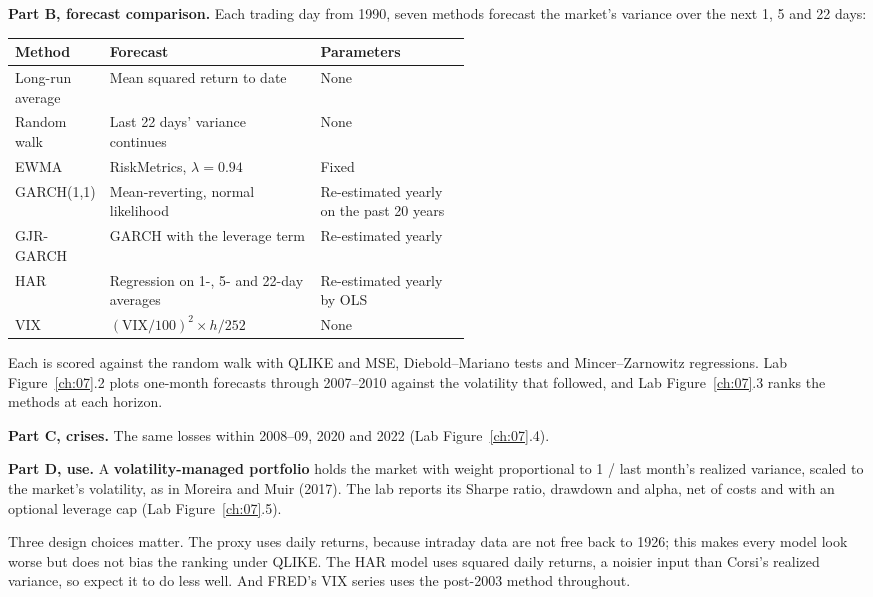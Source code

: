 \textbf{Part B, forecast comparison.} Each trading day from 1990, seven methods forecast the market's variance over the next 1, 5 and 22 days:

\begin{center}
\small
\begin{tabularx}{0.9\linewidth}{@{}>{\raggedright\arraybackslash}p{0.20\linewidth}>{\raggedright\arraybackslash}X>{\raggedright\arraybackslash}p{0.33\linewidth}@{}}
\toprule
Method & Forecast & Parameters \\
\midrule
Long-run average & Mean squared return to date & None \\
Random walk & Last 22 days' variance continues & None \\
EWMA & RiskMetrics, $\lambda = 0.94$ & Fixed \\
GARCH(1,1) & Mean-reverting, normal likelihood & Re-estimated yearly on the past 20 years \\
GJR-GARCH & GARCH with the leverage term & Re-estimated yearly \\
HAR & Regression on 1-, 5- and 22-day averages & Re-estimated yearly by OLS \\
VIX & $(\mathrm{VIX}/100)^2 \times h/252$ & None \\
\bottomrule
\end{tabularx}
\end{center}

Each is scored against the random walk with QLIKE and MSE, Diebold--Mariano tests and Mincer--Zarnowitz regressions. Lab Figure~\ref{ch:07}.2 plots one-month forecasts through 2007--2010 against the volatility that followed, and Lab Figure~\ref{ch:07}.3 ranks the methods at each horizon.

\textbf{Part C, crises.} The same losses within 2008--09, 2020 and 2022 (Lab Figure~\ref{ch:07}.4).

\textbf{Part D, use.} A \textbf{volatility-managed portfolio} holds the market with weight proportional to 1 / last month's realized variance, scaled to the market's volatility, as in Moreira and Muir (2017). The lab reports its Sharpe ratio, drawdown and alpha, net of costs and with an optional leverage cap (Lab Figure~\ref{ch:07}.5).

Three design choices matter. The proxy uses daily returns, because intraday data are not free back to 1926; this makes every model look worse but does not bias the ranking under QLIKE. The HAR model uses squared daily returns, a noisier input than Corsi's realized variance, so expect it to do less well. And FRED's VIX series uses the post-2003 method throughout.

